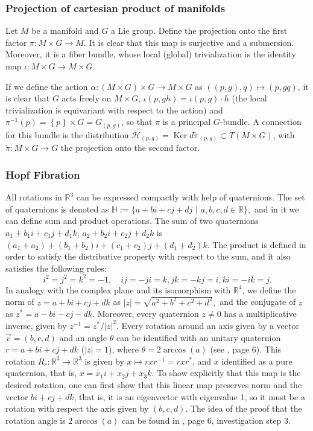 \documentclass[12pt, letterpaper, reqno]{amsart}
\theoremstyle{definition}
\theoremstyle{plain}
\theoremstyle{remark}
\begin{document}
\subsubsection{Projection of cartesian product of manifolds}%
\label{ssub:projection_of_cartesian_product_of_manifolds}

Let $ M$ be a manifold and $ G $ a Lie group. Define the projection onto the first factor $ \pi: M\times G \rightarrow M. $ It is clear that this map is surjective and a submersion. Moreover, it is a fiber bundle, whose local (global) trivialization is the identity map $ \iota : M\times G \rightarrow M\times G $.   

If we define the action $ \alpha: (M\times G) \times G \rightarrow M\times G $ as $ ((p, g),q)\mapsto (p,gq)  $, it is clear that $ G $ acts freely on $ M\times G $, $\iota(p, gh) = \iota(p,g)\cdot h $ (the local trivialization is equivariant with respect to the action) and $ \pi^{-1}(p) = \left\{ p \right\}\times G = G_{(p,g)} $, so that $ \pi $ is a principal $ G $-bundle. A connection for this bundle is the distribution $ \mathcal{H}_{(p,g)}= \operatorname{Ker} d\tilde{\pi}_(p,g)\subset T(M\times G) $, with $ \tilde{\pi}:M\times G \rightarrow G $ the projection onto the second factor.
\subsubsection{Hopf Fibration}%
\label{ssub:hopf_fibration}

All rotations in $ \mathbb{R}^3 $ can be expressed compactly with help of quaternions. The set of quaternions is denoted as $ \mathbb{H} := \{ a+bi+cj+dj$  $|$  $a,b,c,d\in \mathbb{R} \}, $ and in it we can define sum and product operations. The sum of two quaternions $ a_1+b_1 i +c_1 j  + d_1k $, $ a_2+b_2 i +c_2 j  + d_2k $ is $ (a_1+a_2)+(b_1+b_2)i+(c_1+c_2)j+(d_1+d_2)k. $ The product is defined in order to satisfy the distributive property with respect to the sum, and it also satisfies the following rules: 
$$ i^2=j^2=k^2=-1, \quad ij=-ji=k, jk=-kj=i, ki = -ik=j.  $$ 
In analogy with the complex plane and its isomorphism with $\mathbb{R}^4$, we define the norm of $ z= a+bi+cj+dk $ as $ |z|=\sqrt{a^2+b^2+c^2+d^2}, $ and the conjugate of $ z $ as $ z^* = a-bi-cj-dk. $ Moreover, every quaternion $ z\neq 0 $ has a multiplicative inverse, given by $ z^{-1} = z^*/|z|^2. $ Every rotation around an axis given by a vector $ \vec{v}=(b,c,d) $ and an angle $ \theta $ can be identified with an unitary quaternion $r = a+bi+cj+dk$ ($|z|=1$),  where $ \theta = 2\arccos(a) $ (see \cite{lyons2003elementary}, page 6). This rotation $ R_r: \mathbb{R}^3 \rightarrow\mathbb{R}^3 $ is given by $ x\mapsto rxr^{-1}= rxr^*$, and $ x $ identified as a pure quaternion, that is, $ x=x_1i+x_2j+x_3k. $ To show explicitly that this map is the desired rotation, one can first show that this linear map preserves norm and the vector $ bi+cj+dk $, that is, it is an eigenvector with eigenvalue 1, so it must be a rotation with respect the axis given by $ (b,c,d) $. The idea of the proof that the rotation angle is $ 2\arccos(a) $ can be found in \cite{lyons2003elementary}, page 6, investigation step 3. 
\end{document}
